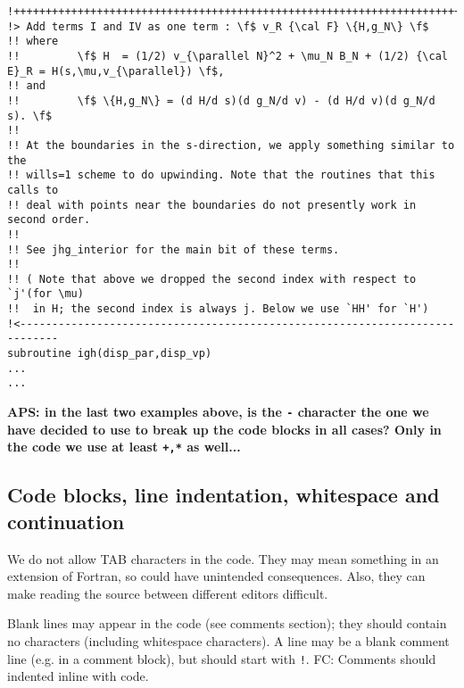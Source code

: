 \documentclass[12pt,twoside,notitlepage,a4paper]{article}
\newcommand{\code}[1]{\texttt{#1}}
\begin{document}
\begin{verbatim}
!++++++++++++++++++++++++++++++++++++++++++++++++++++++++++++++++++++++++++++
!> Add terms I and IV as one term : \f$ v_R {\cal F} \{H,g_N\} \f$
!! where
!!         \f$ H  = (1/2) v_{\parallel N}^2 + \mu_N B_N + (1/2) {\cal E}_R = H(s,\mu,v_{\parallel}) \f$,
!! and
!!         \f$ \{H,g_N\} = (d H/d s)(d g_N/d v) - (d H/d v)(d g_N/d s). \f$
!!
!! At the boundaries in the s-direction, we apply something similar to the
!! wills=1 scheme to do upwinding. Note that the routines that this calls to
!! deal with points near the boundaries do not presently work in second order.
!!
!! See jhg_interior for the main bit of these terms.
!!
!! ( Note that above we dropped the second index with respect to `j'(for \mu)
!!  in H; the second index is always j. Below we use `HH' for `H')
!<----------------------------------------------------------------------------
subroutine igh(disp_par,disp_vp)
...
... 
\end{verbatim}
{\bf APS: in the last two examples above, is the \code{-} character the one we
have decided to use to break up the code blocks in all cases? Only in the code we use at least \code{+,*}
as well...}
\subsection{Code blocks, line indentation, whitespace and continuation}

We do not allow TAB characters in the code. They may mean something in an extension of Fortran, so
could have unintended consequences. Also, they can make reading the source between different
editors difficult.

Blank lines may appear in the code (see comments section); they should contain no characters (including
whitespace characters). A line may be a blank comment line (e.g. in a comment block), but should
start with \code{!}. FC: Comments should indented inline with code.
\end{document}
